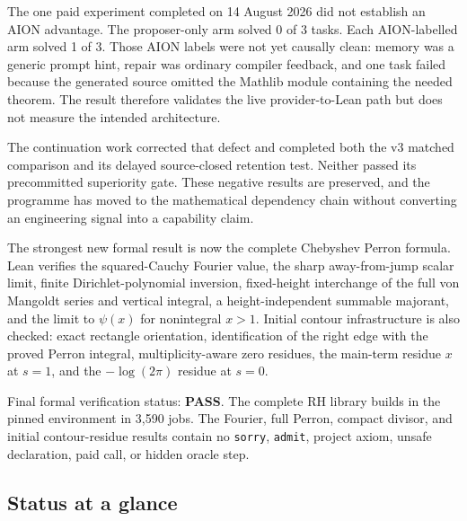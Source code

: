 \documentclass[11pt,a4paper]{article}
\newcommand{\code}[1]{\texttt{#1}}
\begin{document}
The one paid experiment completed on 14 August 2026 did not establish an AION
advantage. The proposer-only arm solved 0 of 3 tasks. Each AION-labelled arm
solved 1 of 3. Those AION labels were not yet causally clean: memory was a
generic prompt hint, repair was ordinary compiler feedback, and one task failed
because the generated source omitted the Mathlib module containing the needed
theorem. The result therefore validates the live provider-to-Lean path but does
not measure the intended architecture.

The continuation work corrected that defect and completed both the v3 matched
comparison and its delayed source-closed retention test. Neither passed its
precommitted superiority gate. These negative results are preserved, and the
programme has moved to the mathematical dependency chain without converting an
engineering signal into a capability claim.

The strongest new formal result is now the complete Chebyshev Perron formula.
Lean verifies the squared-Cauchy Fourier value, the sharp away-from-jump scalar
limit, finite Dirichlet-polynomial inversion, fixed-height interchange of the
full von Mangoldt series and vertical integral, a height-independent summable
majorant, and the limit to $\psi(x)$ for nonintegral $x>1$. Initial contour
infrastructure is also checked: exact rectangle orientation, identification of
the right edge with the proved Perron integral, multiplicity-aware zero
residues, the main-term residue $x$ at $s=1$, and the $-\log(2\pi)$ residue at
$s=0$.

\begin{resultbox}
Final formal verification status: \textbf{PASS}. The complete RH library builds
in the pinned environment in 3,590 jobs. The Fourier, full Perron, compact
divisor, and initial contour-residue results contain no \code{sorry}, \code{admit},
project axiom, unsafe declaration, paid call, or hidden oracle step.
\end{resultbox}

\subsection{Status at a glance}
\end{document}
